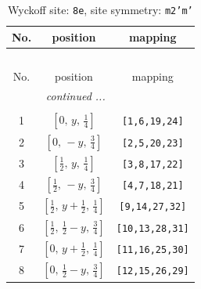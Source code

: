\documentclass[fleqn,8pt]{jsarticle}
\begin{document}
\begin{longtable}{ccc}
\caption{Wyckoff site: {\tt 8e}, site symmetry: {\tt m2'm'}}
 \\
 \hline \hline
No. & position & mapping \\ \hline \endfirsthead

\multicolumn{2}{l}{\tablename\ \thetable{}} \\
 \hline \hline
No. & position & mapping \\ \hline \endhead

 \hline \hline
\multicolumn{2}{r}{\footnotesize\it continued ...} \\ \endfoot

 \hline \hline
\multicolumn{2}{r}{} \\ \endlastfoot

1 & $\left[ 0,\, y,\, \frac{1}{4} \right]$ & {\tt [1,6,19,24]} \\ \hline
2 & $\left[ 0,\, - y,\, \frac{3}{4} \right]$ & {\tt [2,5,20,23]} \\ \hline
3 & $\left[ \frac{1}{2},\, y,\, \frac{1}{4} \right]$ & {\tt [3,8,17,22]} \\ \hline
4 & $\left[ \frac{1}{2},\, - y,\, \frac{3}{4} \right]$ & {\tt [4,7,18,21]} \\ \hline
5 & $\left[ \frac{1}{2},\, y + \frac{1}{2},\, \frac{1}{4} \right]$ & {\tt [9,14,27,32]} \\ \hline
6 & $\left[ \frac{1}{2},\, \frac{1}{2} - y,\, \frac{3}{4} \right]$ & {\tt [10,13,28,31]} \\ \hline
7 & $\left[ 0,\, y + \frac{1}{2},\, \frac{1}{4} \right]$ & {\tt [11,16,25,30]} \\ \hline
8 & $\left[ 0,\, \frac{1}{2} - y,\, \frac{3}{4} \right]$ & {\tt [12,15,26,29]} \\
\end{longtable}
\renewcommand{\arraystretch}{1.2}
\end{document}
